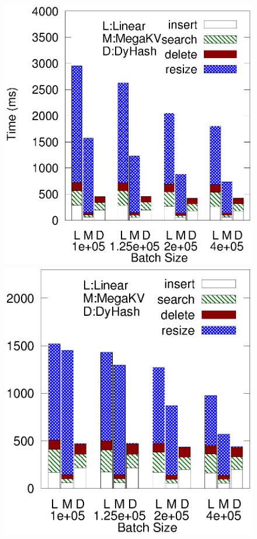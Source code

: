 \begin{figure}[ht]
	\begin{minipage}{0.19\linewidth}\centering
		\includegraphics[width=\linewidth]{pic/dynamic/twitter/diff_batch_size.eps}
		\centerline{\dstwitter}
	\end{minipage}
	\begin{minipage}{0.19\linewidth}\centering
		\includegraphics[width=\linewidth]{pic/dynamic/reddit/diff_batch_size.eps}

\end{minipage}
\end{figure}
